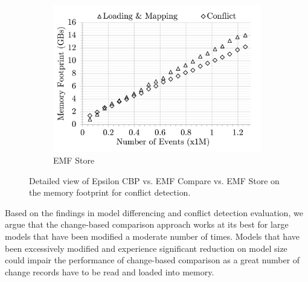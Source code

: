 \begin{figure}[ht]
\begin{subfigure}[t]{0.32\linewidth}
        \includegraphics[width=\linewidth]{emfs-conflict-memory-events}
        \caption{EMF Store}
        \label{fig:emfs-conflict-memory-events}
    \end{subfigure}
    \caption{Detailed view of Epsilon CBP vs. EMF Compare vs. EMF Store on the memory footprint for conflict detection.}
    \label{fig:conflict_memory_events}
\end{figure}

Based on the findings in model differencing and conflict detection evaluation, we argue that the change-based comparison approach works at its best for large models that have been modified a moderate number of times. Models that have been excessively modified and experience significant reduction on model size could impair the performance of change-based comparison as a great number of change records have to be read and loaded into memory. 

